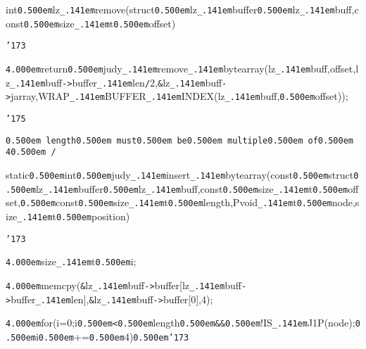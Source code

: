 \noindent
{}\hfill

\noindent
{}int{\tt\mc \kern0.500em}lz{\tt\_\kern.141em}remove(struct{\tt\mc \kern0.500em}lz{\tt\_\kern.141em}buffer{\tt *}{\tt\mc \kern0.500em}lz{\tt\_\kern.141em}buff,const{\tt\mc \kern0.500em}size{\tt\_\kern.141em}t{\tt\mc \kern0.500em}offset)

\noindent
{}{\tt\char'173}

\noindent
{}{\tt\mc \kern4.000em}return{\tt\mc \kern0.500em}judy{\tt\_\kern.141em}remove{\tt\_\kern.141em}bytearray(lz{\tt\_\kern.141em}buff,offset,lz{\tt\_\kern.141em}buff{\tt -}{\tt >}buffer{\tt\_\kern.141em}len{\tt /}2,{\tt\&}lz{\tt\_\kern.141em}buff{\tt -}{\tt >}jarray,WRAP{\tt\_\kern.141em}BUFFER{\tt\_\kern.141em}INDEX(lz{\tt\_\kern.141em}buff,{\tt\mc \kern0.500em}offset));

\noindent
{}{\tt\char'175}

\noindent
{}\hfill

\noindent
{}\hfill

\noindent
{}\tt\mc {\tt /}{\tt *}\kern0.500em length\kern0.500em must\kern0.500em be\kern0.500em multiple\kern0.500em of\kern0.500em 4\kern0.500em {\tt *}{\tt /}
\tt\mc 

\noindent
{}static{\tt\mc \kern0.500em}int{\tt\mc \kern0.500em}judy{\tt\_\kern.141em}insert{\tt\_\kern.141em}bytearray(const{\tt\mc \kern0.500em}struct{\tt\mc \kern0.500em}lz{\tt\_\kern.141em}buffer{\tt *}{\tt\mc \kern0.500em}lz{\tt\_\kern.141em}buff,const{\tt\mc \kern0.500em}size{\tt\_\kern.141em}t{\tt\mc \kern0.500em}offset,{\tt\mc \kern0.500em}const{\tt\mc \kern0.500em}size{\tt\_\kern.141em}t{\tt\mc \kern0.500em}length,Pvoid{\tt\_\kern.141em}t{\tt *}{\tt\mc \kern0.500em}node,size{\tt\_\kern.141em}t{\tt\mc \kern0.500em}position)

\noindent
{}{\tt\char'173}

\noindent
{}{\tt\mc \kern4.000em}size{\tt\_\kern.141em}t{\tt\mc \kern0.500em}i;

\noindent
{}\hfill

\noindent
{}\hfill

\noindent
{}{\tt\mc \kern4.000em}memcpy({\tt\&}lz{\tt\_\kern.141em}buff{\tt -}{\tt >}buffer[lz{\tt\_\kern.141em}buff{\tt -}{\tt >}buffer{\tt\_\kern.141em}len],{\tt\&}lz{\tt\_\kern.141em}buff{\tt -}{\tt >}buffer[0],4);

\noindent
{}\hfill

\noindent
{}{\tt\mc \kern4.000em}for(i=0;i{\tt\mc \kern0.500em}{\tt <}{\tt\mc \kern0.500em}length{\tt\mc \kern0.500em}{\tt\&}{\tt\&}{\tt\mc \kern0.500em}!IS{\tt\_\kern.141em}J1P({\tt *}node);{\tt\mc \kern0.500em}i{\tt\mc \kern0.500em}+={\tt\mc \kern0.500em}4){\tt\mc \kern0.500em}{\tt\char'173}

